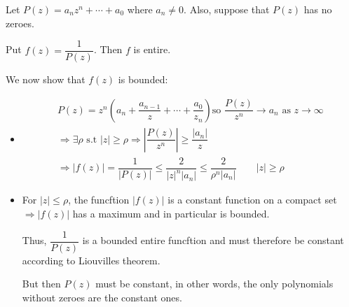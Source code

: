 \begin{prf}[]{}
  Let $P(z) = a_nz^n+\cdots+a_0$ where $a_n\neq0$. Also, suppose that $P(z)$ has no zeroes.
  \par\bigskip
  \noindent Put $f(z) = \dfrac{1}{P(z)}$. Then $f$ is entire.
  \par\bigskip
  \noindent We now show that $f(z)$ is bounded:\par
  \begin{itemize}
    \item 
      \begin{equation*}
        \begin{gathered}
          P(z) = z^n\left(a_n+\dfrac{a_{n-1}}{z}+\cdots+\dfrac{a_0}{z_n}\right)
          \text{so } \dfrac{P(z)}{z^n}\to a_n \text{ as } z\to\infty\\
          \Rightarrow\exists\rho \text{ s.t } \left|z\right|\geq\rho\Rightarrow \left|\dfrac{P(z)}{z^n}\right|\geq\dfrac{\left|a_n\right|}{z}\\
          \Rightarrow \left|f(z)\right| = \dfrac{1}{\left|P(z)\right|}\leq\dfrac{2}{\left|z\right|^n\left|a_n\right|}\leq \dfrac{2}{\rho^n\left|a_n\right|}\qquad \left|z\right|\geq\rho
        \end{gathered}
      \end{equation*}
      \par\bigskip
    \item For  $\left|z\right|\leq\rho$, the funcftion $\left|f(z)\right|$ is a constant function on a compact set $\Rightarrow\left|f(z)\right|$ has a maximum and in particular is bounded.\par
      \noindent Thus, $\dfrac{1}{P(z)}$ is a bounded entire funcftion and must therefore be constant according to Liouvilles theorem.
      \par\bigskip
      \noindent But then $P(z)$ must be constant, in other words, the only polynomials without zeroes are the constant ones. 
  \end{itemize}
\end{prf}
